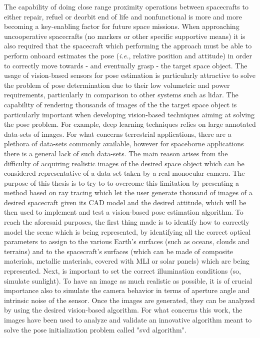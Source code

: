 
The capability of doing close range proximity operations between spacecrafts to either repair, refuel or deorbit end of life and nonfunctional is more and more becoming a key-enabling factor for future space missions. When approaching uncooperative spacecrafts (no markers or other specific supportive means) it is also required that the spacecraft which performing the approach must be able to perform onboard estimates the pose (\textit{i.e.}, relative position and attitude) in order to correctly move towards - and eventually grasp - the target space object. The usage of vision-based sensors for pose estimation is particularly attractive to solve the problem of pose determination due to their low volumetric and power requirements, particularly in comparison to other systems such as \acrshort{lidar}. The capability of rendering thousands of images of the the target space object is particularly important when developing vision-based techniques aiming at solving the pose problem. For example, deep learning techniques relies on large annotated data-sets of images. For what concerns terrestrial applications, there are a plethora of data-sets commonly available, however for spaceborne applications there is a general lack of such data-sets. The main reason arises from the difficulty of acquiring realistic images of the desired space object which can be considered representative of a data-set taken by a real monocular camera. 
The purpose of this thesis is to try to to overcome this limitation by presenting a method based on ray tracing which let the user generate thousand of images of a desired spacecraft given its CAD model and the desired attitude, which will be then used to implement and test a vision-based pose estimation algorithm.
To reach the aforesaid purposes, the first thing made is to identify how to correctly model the scene which is being represented, by identifying all the correct optical parameters to assign to the various Earth's surfaces (such as oceans, clouds and terrains) and to the spacecraft's surfaces (which can be made of composite materials, metallic materials, covered with MLI or solar panels) which are being represented. Next, is important to set the correct illumination conditions (so, simulate sunlight). To have an image as much realistic as possible, it is of crucial importance also to simulate the camera behavior in terms of aperture angle and intrinsic noise of the sensor. Once the images are generated, they can be analyzed by using the desired vision-based algorithm. For what concerns this work, the images have been used to analyze and validate an innovative algorithm meant to solve the pose initialization problem called "\acrshort{svd} algorithm".
